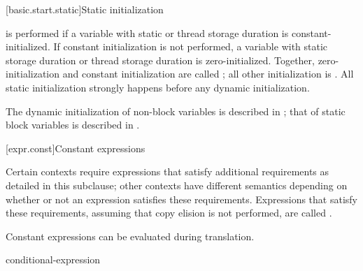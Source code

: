 \documentclass{wg21}
\begin{document}
[basic.start.static]{Static initialization}


\pnum
{}%
 is performed
if a variable  with static or thread storage duration
is constant-initialized.
%
If constant initialization is not performed, a variable with static
storage duration or thread storage
duration is zero-initialized.
Together, zero-initialization and constant initialization are called
;
all other initialization is .
All static initialization strongly happens before
any dynamic initialization.
\begin{note}
    The dynamic initialization of non-block variables is described
    in ; that of static block variables is described
    in .
\end{note}

[expr.const]{Constant expressions}


\pnum
Certain contexts require expressions that satisfy additional
requirements as detailed in this subclause; other contexts have different
semantics depending on whether or not an expression satisfies these requirements.
Expressions that satisfy these requirements,
assuming that copy elision is not performed,
are called
%
.
\begin{note}
    Constant expressions can be evaluated
    during translation.
\end{note}

\begin{bnf}
    \br
    conditional-expression
\end{bnf}
\end{document}
